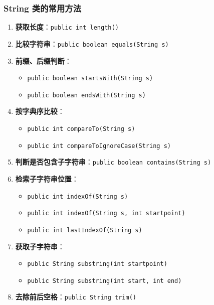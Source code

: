 \documentclass[a4paper, 10pt]{ctexart}
\begin{document}
\subsubsection{String 类的常用方法}
\begin{enumerate}
  \item \textbf{获取长度}：\texttt{public int length()}
  \item \textbf{比较字符串}：\texttt{public boolean equals(String s)}
  \item \textbf{前缀、后缀判断}：
  \begin{itemize}
    \item \texttt{public boolean startsWith(String s)}
    \item \texttt{public boolean endsWith(String s)}
  \end{itemize}
  \item \textbf{按字典序比较}：
  \begin{itemize}
    \item \texttt{public int compareTo(String s)}
    \item \texttt{public int compareToIgnoreCase(String s)}
  \end{itemize}
  \item \textbf{判断是否包含子字符串}：\texttt{public boolean contains(String s)}
  \item \textbf{检索子字符串位置}：
  \begin{itemize}
    \item \texttt{public int indexOf(String s)}
    \item \texttt{public int indexOf(String s, int startpoint)}
    \item \texttt{public int lastIndexOf(String s)}
  \end{itemize}
  \item \textbf{获取子字符串}：
  \begin{itemize}
    \item \texttt{public String substring(int startpoint)}
    \item \texttt{public String substring(int start, int end)}
  \end{itemize}
  \item \textbf{去除前后空格}：\texttt{public String trim()}
\end{enumerate}
\end{document}
